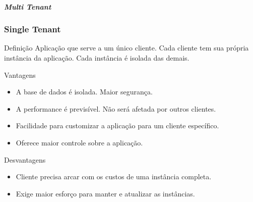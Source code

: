 \documentclass[
	9pt, %
	t, %
]{beamer}
\begin{document}
\begin{frame}
	\framesubtitle{\textit{Multi Tenant}}
	\frametitle{Single Tenant}

	\begin{block}{Definição}
		Aplicação que serve a um único cliente. Cada cliente tem sua própria instância da aplicação. Cada instância é isolada das demais.
	\end{block}

	\begin{exampleblock}{Vantagens}
		\begin{itemize}
			\item A base de dados é isolada. Maior segurança.
			\item A performance é previsível. Não será afetada por outros clientes.
			\item Facilidade para customizar a aplicação para um cliente específico.
			\item Oferece maior controle sobre a aplicação.
		\end{itemize}
	\end{exampleblock}

	\begin{alertblock}{Desvantagens}
		\begin{itemize}
			\item Cliente precisa arcar com os custos de uma instância completa.
			\item Exige maior esforço para manter e atualizar as instâncias.
		\end{itemize}
	\end{alertblock}

\end{frame}
\end{document}
